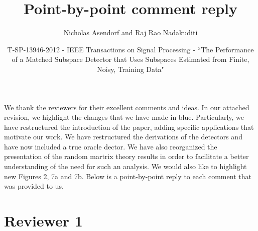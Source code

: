 \documentclass[11pt]{article}
\title{Point-by-point comment reply}
\author{Nicholas Asendorf and Raj Rao Nadakuditi}
\date{T-SP-13946-2012 - IEEE Transactions on Signal Processing - ``The Performance of a Matched Subspace Detector that Uses Subspaces Estimated from Finite, Noisy, Training Data"}
\begin{document}
\maketitle

We thank the reviewers for their excellent comments and ideas. In our attached revision, we highlight the changes that we have made in blue. Particularly, we have restructured the introduction of the paper, adding specific applications that motivate our work. We have restructured the derivations of the detectors and have now included a true oracle dector. We have also reorganized the presentation of the random martrix theory results in order to facilitate a better understanding of the need for such an analysis. We would also like to highlight new Figures 2, 7a and 7b. Below is a point-by-point reply to each comment that was provided to us.

\section*{Reviewer 1}
\end{document}
